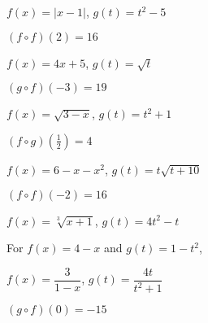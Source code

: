 \documentclass{ximera}
\begin{document}
\begin{question}
$f(x) = |x-1|$, $g(t) = t^2-5$

\begin{solution}
$(f \circ f)(2) = 16$








\end{solution}

\end{question}

\begin{question}
$f(x) = 4x+5$, $g(t) = \sqrt{t}$
\begin{solution}
$(g\circ f)(-3) = 19$
\end{solution}

\end{question}

\begin{question}
$f(x) = \sqrt{3-x}$, $g(t) = t^2+1$

\begin{solution}
$(f\circ g)\left(\frac{1}{2}\right) = 4$
\end{solution}

\end{question}

\begin{question}
$f(x) = 6-x-x^2$, $g(t) = t\sqrt{t+10}$
\begin{solution}
$(f \circ f)(-2) = 16$


\end{solution}

\end{question}

\begin{question}
$f(x) = \sqrt[3]{x+1}$, $g(t) = 4t^2-t$

\begin{solution}
For   $f(x) = 4-x$ and $g(t) = 1-t^2$,



\end{solution}

\end{question}

\begin{question}
$f(x) = \dfrac{3}{1-x}$, $g(t) = \dfrac{4t}{t^2+1}$
\begin{solution}
$(g\circ f)(0) = -15$
\end{solution}

\end{question}
\end{document}
